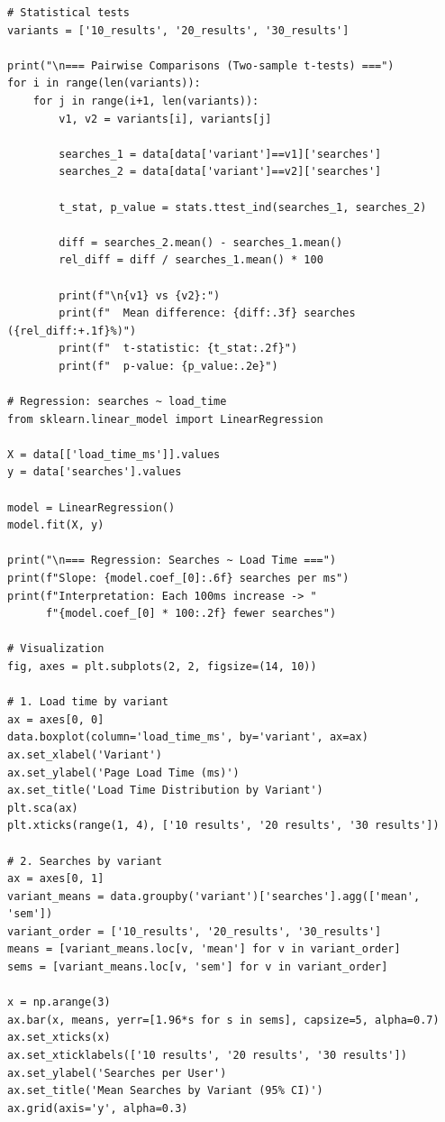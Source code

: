 \begin{lstlisting}
# Statistical tests
variants = ['10_results', '20_results', '30_results']

print("\n=== Pairwise Comparisons (Two-sample t-tests) ===")
for i in range(len(variants)):
    for j in range(i+1, len(variants)):
        v1, v2 = variants[i], variants[j]

        searches_1 = data[data['variant']==v1]['searches']
        searches_2 = data[data['variant']==v2]['searches']

        t_stat, p_value = stats.ttest_ind(searches_1, searches_2)

        diff = searches_2.mean() - searches_1.mean()
        rel_diff = diff / searches_1.mean() * 100

        print(f"\n{v1} vs {v2}:")
        print(f"  Mean difference: {diff:.3f} searches ({rel_diff:+.1f}%)")
        print(f"  t-statistic: {t_stat:.2f}")
        print(f"  p-value: {p_value:.2e}")

# Regression: searches ~ load_time
from sklearn.linear_model import LinearRegression

X = data[['load_time_ms']].values
y = data['searches'].values

model = LinearRegression()
model.fit(X, y)

print("\n=== Regression: Searches ~ Load Time ===")
print(f"Slope: {model.coef_[0]:.6f} searches per ms")
print(f"Interpretation: Each 100ms increase -> "
      f"{model.coef_[0] * 100:.2f} fewer searches")

# Visualization
fig, axes = plt.subplots(2, 2, figsize=(14, 10))

# 1. Load time by variant
ax = axes[0, 0]
data.boxplot(column='load_time_ms', by='variant', ax=ax)
ax.set_xlabel('Variant')
ax.set_ylabel('Page Load Time (ms)')
ax.set_title('Load Time Distribution by Variant')
plt.sca(ax)
plt.xticks(range(1, 4), ['10 results', '20 results', '30 results'])

# 2. Searches by variant
ax = axes[0, 1]
variant_means = data.groupby('variant')['searches'].agg(['mean', 'sem'])
variant_order = ['10_results', '20_results', '30_results']
means = [variant_means.loc[v, 'mean'] for v in variant_order]
sems = [variant_means.loc[v, 'sem'] for v in variant_order]

x = np.arange(3)
ax.bar(x, means, yerr=[1.96*s for s in sems], capsize=5, alpha=0.7)
ax.set_xticks(x)
ax.set_xticklabels(['10 results', '20 results', '30 results'])
ax.set_ylabel('Searches per User')
ax.set_title('Mean Searches by Variant (95% CI)')
ax.grid(axis='y', alpha=0.3)


\end{lstlisting}
